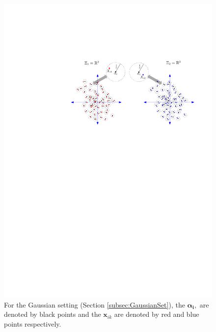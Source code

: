 \documentclass[12pt]{article} %
\begin{document}
    \begin{figure}
	\begin{center}
    \includegraphics[scale=0.55]{MVN_alpha_r_multiple_sancar.pdf}
    \caption{For the  Gaussian setting (Section \ref{subsec:GaussianSet}), the $\bm{\alpha_i},$ are denoted by black points and the $\bm{x}_{ik}$ are denoted by red and blue points respectively.}
\label{fig:Fig1}
	\end{center}
  \end{figure}

\end{document}

